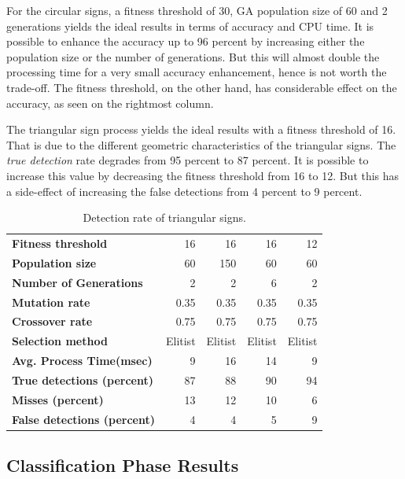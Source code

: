 \documentclass[review,number]{elsarticle}
\begin{document}
\par
For the circular signs, a fitness threshold of 30, GA population size of 60 and 2 generations yields the ideal results in terms of accuracy and CPU time. It is possible to enhance the accuracy up to 96 percent by increasing either the population size or the number of generations. But this will almost double the processing time for a very small accuracy enhancement, hence is not worth the trade-off. The fitness threshold, on the other hand, has considerable effect on the accuracy, as seen on the rightmost column.
\par
The triangular sign process yields the ideal results with a fitness threshold of 16. That is due to the different geometric characteristics of the triangular signs. The \textit{true detection} rate degrades from 95 percent to 87 percent. It is possible to increase this value by decreasing the fitness threshold from 16 to 12. But this has a side-effect of increasing the false detections from 4 percent to 9 percent.

\begin{table}[ht]
	\centering
	\caption{Detection rate of triangular signs.}
	\label{signdetect-table-2}
\begin{tabular}{l r r r r}
\hline
\textbf{Fitness threshold} 		& 16 & 16 & 16 & 12 \\
\textbf{Population size} 			& 60 & 150 & 60 & 60 \\
\textbf{Number of Generations} 	& 2 & 2 & 6 & 2 \\
\textbf{Mutation rate}     		& 0.35 & 0.35 & 0.35 & 0.35 \\
\textbf{Crossover rate} 				& 0.75 & 0.75 & 0.75 & 0.75 \\
\textbf{Selection method} 				& Elitist & Elitist & Elitist & Elitist \\
\hline
\rowcolor[rgb]{0.95,0.95,0.95}\textbf{Avg. Process Time(msec)}			& 9 & 16 & 14 & 9 \\
\rowcolor[rgb]{0.95,0.95,0.95}\textbf{True detections (percent)}				& 87 & 88 & 90 & 94 \\
\rowcolor[rgb]{0.95,0.95,0.95}\textbf{Misses (percent)}				&  13 & 12 & 10 & 6 \\
\hline
\rowcolor[rgb]{0.95,0.95,0.95}\textbf{False detections (percent)}				&  4 &  4 &  5 &  9 \\
\hline
\end{tabular}
\end{table}

\subsection{Classification Phase Results}
\end{document}
